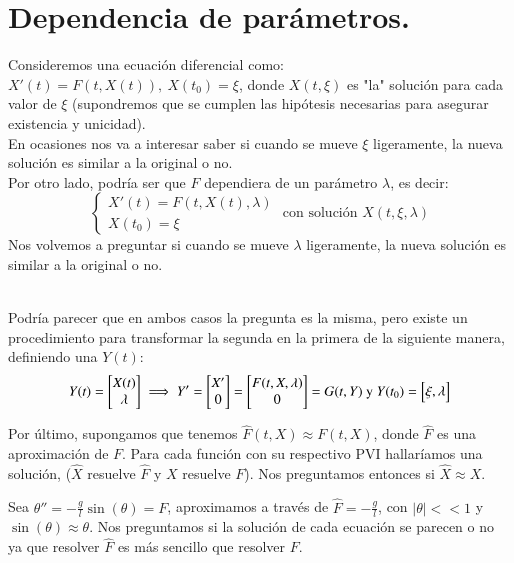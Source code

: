 \section{Dependencia de parámetros.} %

Consideremos una ecuación diferencial como: $X'(t) = F(t, X(t)),\ X(t_0) = \xi$, donde $X(t, \xi)$ es "la" solución para cada valor de $\xi$ (supondremos que se cumplen las hipótesis necesarias para asegurar existencia y unicidad).\\
En ocasiones nos va a interesar saber si cuando se mueve $\xi$ ligeramente, la nueva solución es similar a la original o no.\\
Por otro lado, podría ser que $F$ dependiera de un parámetro $\lambda$, es decir:
$$
    \begin{cases}
        X'(t) = F(t, X(t), \lambda)\\
        X(t_0) = \xi
    \end{cases} \text{ con solución } X(t, \xi, \lambda)
$$
Nos volvemos a preguntar si cuando se mueve $\lambda$ ligeramente, la nueva solución es similar a la original o no.\\\\
\begin{obs}
    Podría parecer que en ambos casos la pregunta es la misma, pero existe un procedimiento para transformar la segunda en la primera de la siguiente manera, definiendo una $Y(t)$:
    $$
        Y(t) = \mx{X(t)\\\lambda} \implies Y' = \mx{X'\\0} = \mx{F(t, X, \lambda)\\0} = G(t, Y) \text{ y } Y(t_0) = \mx{\xi, \lambda}
    $$
\end{obs}
Por último, supongamos que tenemos $\hat{F}(t, X) \approx F(t, X)$, donde $\hat{F}$ es una aproximación de $F$. Para cada función con su respectivo PVI hallaríamos una solución, ($\hat{X}$ resuelve $\hat{F}$ y $X$ resuelve $F$). Nos preguntamos entonces si $\hat{X} \approx X$.

\begin{eg}
    Sea $\theta''=-\frac{g}{l}\sin(\theta) = F$, aproximamos a través de $\hat{F} = -\frac{g}{l}$, con $|\theta| << 1$ y $\sin(\theta) \approx \theta$. Nos preguntamos si la solución de cada ecuación se parecen o no ya que resolver $\hat{F}$ es más sencillo que resolver $F$.
\end{eg}


